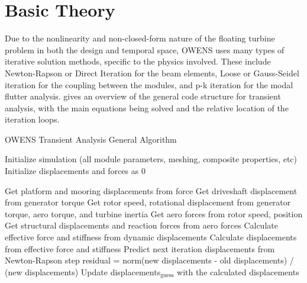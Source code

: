\documentclass[11pt]{article}
\begin{document}
\section{Basic Theory}

Due to the nonlinearity and non-closed-form nature of the floating turbine problem in both the design and temporal space, OWENS uses many types of iterative solution methods, specific to the physics involved.  These include Newton-Rapson or Direct Iteration for the beam elements, Loose or Gauss-Seidel iteration for the coupling between the modules, and p-k iteration for the modal flutter analysis.   gives an overview of the general code structure for transient analysis, with the main equations being solved and the relative location of the iteration loops.

\begin{algorithm}
\caption{OWENS Transient Analysis General Algorithm}
\begin{spacing}{1.18}
\begin{algorithmic}[1]
\State Initialize simulation (all module parameters, meshing, composite properties, etc)
\State Initialize displacements and forces as 0


		\State Get platform and mooring displacements from force
		\State Get driveshaft displacement from generator torque
		\State Get rotor speed, rotational displacement from generator torque, aero torque, and turbine inertia
		\State Get aero forces from rotor speed, position
		\State Get structural displacements and reaction forces from aero forces
			\State Calculate effective force and stiffness from dynamic displacements
			\State Calculate displacements from effective force and stiffness
			\State Predict next iteration displacements from Newton-Rapson step
			\State residual = norm(new displacements - old displacements) / (new displacements)
		\EndWhile
		\State Update displacements$_\text{guess}$ with the calculated displacements
	\EndWhile
\EndFor

\end{algorithmic}
\end{spacing}
\label{alg:Transient}
\end{algorithm}
\end{document}
